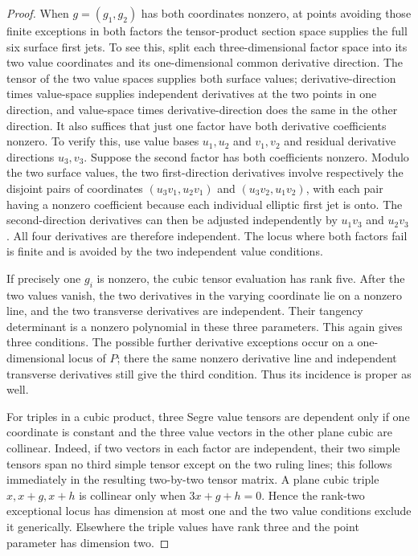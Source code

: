 \documentclass[11pt]{article}
\theoremstyle{definition}\newtheorem{definition}[theorem]{Definition}
\theoremstyle{remark}\newtheorem{remark}[theorem]{Remark}
\begin{document}
\begin{proof}
When $g=(g_1,g_2)$ has both coordinates nonzero, at points avoiding those finite exceptions in both factors the tensor-product section space supplies the full six surface first jets. To see this, split each three-dimensional factor space into its two value coordinates and its one-dimensional common derivative direction. The tensor of the two value spaces supplies both surface values; derivative-direction times value-space supplies independent derivatives at the two points in one direction, and value-space times derivative-direction does the same in the other direction. It also suffices that just one factor have both derivative coefficients nonzero. To verify this, use value bases $u_1,u_2$ and $v_1,v_2$ and residual derivative directions $u_3,v_3$. Suppose the second factor has both coefficients nonzero. Modulo the two surface values, the two first-direction derivatives involve respectively the disjoint pairs of coordinates $(u_3v_1,u_2v_1)$ and $(u_3v_2,u_1v_2)$, with each pair having a nonzero coefficient because each individual elliptic first jet is onto. The second-direction derivatives can then be adjusted independently by $u_1v_3$ and $u_2v_3$. All four derivatives are therefore independent. The locus where both factors fail is finite and is avoided by the two independent value conditions.

If precisely one $g_i$ is nonzero, the cubic tensor evaluation has rank five. After the two values vanish, the two derivatives in the varying coordinate lie on a nonzero line, and the two transverse derivatives are independent. Their tangency determinant is a nonzero polynomial in these three parameters. This again gives three conditions. The possible further derivative exceptions occur on a one-dimensional locus of $P$; there the same nonzero derivative line and independent transverse derivatives still give the third condition. Thus its incidence is proper as well.

For triples in a cubic product, three Segre value tensors are dependent only if one coordinate is constant and the three value vectors in the other plane cubic are collinear. Indeed, if two vectors in each factor are independent, their two simple tensors span no third simple tensor except on the two ruling lines; this follows immediately in the resulting two-by-two tensor matrix. A plane cubic triple $x,x+g,x+h$ is collinear only when $3x+g+h=0$. Hence the rank-two exceptional locus has dimension at most one and the two value conditions exclude it generically. Elsewhere the triple values have rank three and the point parameter has dimension two.


\end{proof}
\end{document}
